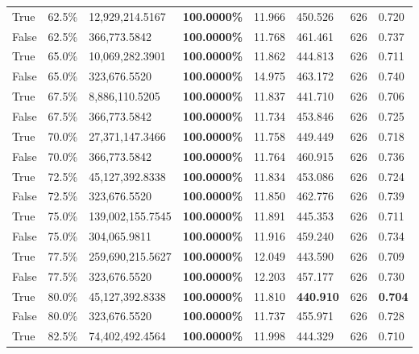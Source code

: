 \begin{table}[H]
\begin{tabular}{lllrllll}
\cline{1-8}
True & 62.5\% & 12,929,214.5167 & \bfseries \color{red} 100.0000\% & 11.966 & 450.526 & 626 & 0.720 \\
\cline{1-8}
False & 62.5\% & 366,773.5842 & \bfseries \color{red} 100.0000\% & 11.768 & 461.461 & 626 & 0.737 \\
\cline{1-8}
True & 65.0\% & 10,069,282.3901 & \bfseries \color{red} 100.0000\% & 11.862 & 444.813 & 626 & 0.711 \\
\cline{1-8}
False & 65.0\% & 323,676.5520 & \bfseries \color{red} 100.0000\% & 14.975 & 463.172 & 626 & 0.740 \\
\cline{1-8}
True & 67.5\% & 8,886,110.5205 & \bfseries \color{red} 100.0000\% & 11.837 & 441.710 & 626 & 0.706 \\
\cline{1-8}
False & 67.5\% & 366,773.5842 & \bfseries \color{red} 100.0000\% & 11.734 & 453.846 & 626 & 0.725 \\
\cline{1-8}
True & 70.0\% & 27,371,147.3466 & \bfseries \color{red} 100.0000\% & 11.758 & 449.449 & 626 & 0.718 \\
\cline{1-8}
False & 70.0\% & 366,773.5842 & \bfseries \color{red} 100.0000\% & 11.764 & 460.915 & 626 & 0.736 \\
\cline{1-8}
True & 72.5\% & 45,127,392.8338 & \bfseries \color{red} 100.0000\% & 11.834 & 453.086 & 626 & 0.724 \\
\cline{1-8}
False & 72.5\% & 323,676.5520 & \bfseries \color{red} 100.0000\% & 11.850 & 462.776 & 626 & 0.739 \\
\cline{1-8}
True & 75.0\% & 139,002,155.7545 & \bfseries \color{red} 100.0000\% & 11.891 & 445.353 & 626 & 0.711 \\
\cline{1-8}
False & 75.0\% & 304,065.9811 & \bfseries \color{red} 100.0000\% & 11.916 & 459.240 & 626 & 0.734 \\
\cline{1-8}
True & 77.5\% & 259,690,215.5627 & \bfseries \color{red} 100.0000\% & 12.049 & 443.590 & 626 & 0.709 \\
\cline{1-8}
False & 77.5\% & 323,676.5520 & \bfseries \color{red} 100.0000\% & 12.203 & 457.177 & 626 & 0.730 \\
\cline{1-8}
True & 80.0\% & 45,127,392.8338 & \bfseries \color{red} 100.0000\% & 11.810 & \bfseries \color{red} 440.910 & 626 & \bfseries \color{red} 0.704 \\
\cline{1-8}
False & 80.0\% & 323,676.5520 & \bfseries \color{red} 100.0000\% & 11.737 & 455.971 & 626 & 0.728 \\
\cline{1-8}
True & 82.5\% & 74,402,492.4564 & \bfseries \color{red} 100.0000\% & 11.998 & 444.329 & 626 & 0.710 \\

\end{tabular}
\end{table}
